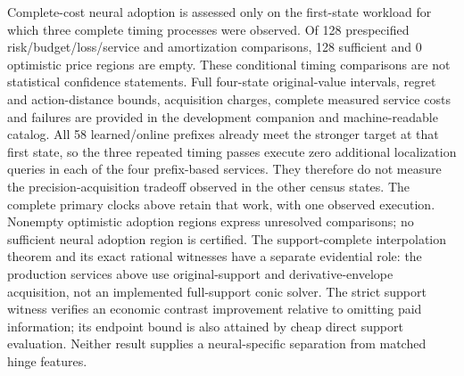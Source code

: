 Complete-cost neural adoption is assessed only on the first-state workload for which three complete timing processes were observed. Of 128 prespecified risk/budget/loss/service and amortization comparisons, 128 sufficient and 0 optimistic price regions are empty. These conditional timing comparisons are not statistical confidence statements. Full four-state original-value intervals, regret and action-distance bounds, acquisition charges, complete measured service costs and failures are provided in the development companion and machine-readable catalog.
All 58 learned/online prefixes already meet the stronger target at that first state, so the three repeated timing passes execute zero additional localization queries in each of the four prefix-based services. They therefore do not measure the precision-acquisition tradeoff observed in the other census states. The complete primary clocks above retain that work, with one observed execution. Nonempty optimistic adoption regions express unresolved comparisons; no sufficient neural adoption region is certified.
The support-complete interpolation theorem and its exact rational witnesses have a separate evidential role: the production services above use original-support and derivative-envelope acquisition, not an implemented full-support conic solver. The strict support witness verifies an economic contrast improvement relative to omitting paid information; its endpoint bound is also attained by cheap direct support evaluation. Neither result supplies a neural-specific separation from matched hinge features.
